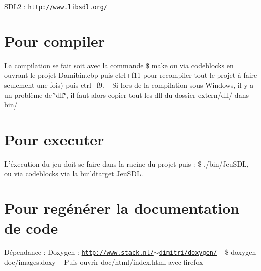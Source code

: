 \begin{DoxyItemize}
\item S\+D\+L2 \+: \href{http://www.libsdl.org/}{\tt http\+://www.\+libsdl.\+org/} ~\newline
 ~\newline

\end{DoxyItemize}\hypertarget{index_compil}{}\section{Pour compiler}\label{index_compil}
La compilation se fait soit avec la commande \$ make ou via codeblocks en ouvrant le projet Damibin.\+cbp puis ctrl+f11 pour recompiler tout le projet à faire seulement une fois) puis ctrl+f9. ~\newline
 Si lors de la compilation sous Windows, il y a un problème de \char`\"{}dll\char`\"{}, il faut alors copier tout les dll du dossier extern/dll/ dans bin/ ~\newline
 ~\newline
\hypertarget{index_exec}{}\section{Pour executer}\label{index_exec}
L'éxecution du jeu doit se faire dans la racine du projet puis \+: \$ ./bin/\+Jeu\+S\+D\+L, ou via codeblocks via la buildtarget Jeu\+S\+D\+L. ~\newline
 ~\newline
\hypertarget{index_doc}{}\section{Pour regénérer la documentation de code}\label{index_doc}
Dépendance \+: Doxygen \+: \href{http://www.stack.nl/~dimitri/doxygen/}{\tt http\+://www.\+stack.\+nl/$\sim$dimitri/doxygen/} ~\newline
 \$ doxygen doc/images.\+doxy ~\newline
 Puis ouvrir doc/html/index.\+html avec firefox ~\newline
 